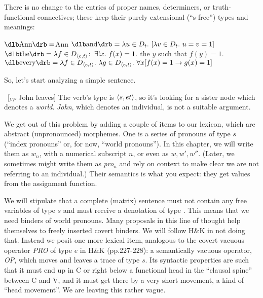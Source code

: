There is no change to the entries of proper names, determiners, or
truth-functional connectives; these keep their purely extensional (``s-free'')
types and meanings:

\pex
\a $\sv{\mbox{Ann}} = $Ann 
\a $\sv{\mbox{and}} = \lambda u\in D_{t}.\ [ \lambda v\in D_{t}.\ u=v=1]$ 
\a $\sv{\mbox{the}} = \lambda f\in D_{\type{e,t}}\co \exists !x.\ f(x) = 1.$ the $y$ such that $f(y) = 1$. 
\a $\sv{\mbox{every}} = \lambda f\in D_{\type{e,t}}.\ \lambda g\in D_{\type{e,t}}.\ \forall x [ f(x) = 1 \rightarrow g(x) = 1]$
\xe

So, let's start analyzing a simple sentence.

\ex\ [$_{VP}$ John leaves] \xe
%
The verb's type is $\langle s,et \rangle$, so it's looking for a sister node which
denotes a \emph{world}. \emph{John}, which denotes an individual, is not a
suitable argument. 

We get out of this problem by adding a couple of items to our lexicon, which are
abstract (unpronounced) morphemes. One is a series of pronouns of type $s$
(``index pronouns'' or, for now, ``world pronouns''). In this chapter, we will
write them as $w_n$, with a numerical subscript $n$, or even as $w, w', w''$.
(Later, we sometimes might write them as \emph{pro}$_n$ and rely on context to
make clear we are not referring to an individual.) Their semantics is what you
expect: they get values from the assignment function.

\clearpage
{}%
We will stipulate that a complete (matrix) sentence must not contain any free
variables of type $s$ and must receive a denotation of type . This
means that we need binders of world pronouns. Many proposals in this line of
thought help themselves to freely inserted covert binders. We will follow H\&K
in not doing that. Instead we posit one more lexical item, analogous to the
covert vacuous operator \emph{PRO} of type $e$ in H\&K (pp.227-228): a
semantically vacuous operator, \emph{OP}, which moves and leaves a trace of type
$s$. Its syntactic properties are such that it must end up in C or right below a
functional head in the ``clausal spine'' between C and V, and it must get there
by a very short movement, a kind of ``head movement''. We are leaving this
rather vague.


